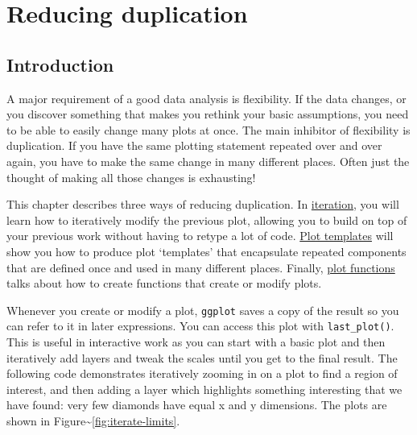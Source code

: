 \chapter{Reducing duplication}\label{cha:duplication}

\section{Introduction}

A major requirement of a good data analysis is flexibility. If the data
changes, or you discover something that makes you rethink your basic
assumptions, you need to be able to easily change many plots at once.
The main inhibitor of flexibility is duplication. If you have the same
plotting statement repeated over and over again, you have to make the
same change in many different places. Often just the thought of making
all those changes is exhausting!

This chapter describes three ways of reducing duplication. In
\hyperref[sec:iteration]{iteration}, you will learn how to iteratively
modify the previous plot, allowing you to build on top of your previous
work without having to retype a lot of code.
\hyperref[sec:templates]{Plot templates} will show you how to produce
plot `templates' that encapsulate repeated components that are defined
once and used in many different places. Finally,
\hyperref[sec:functions]{plot functions} talks about how to create
functions that create or modify plots. 


Whenever you create or modify a plot, \texttt{ggplot} saves a copy of
the result so you can refer to it in later expressions. You can access
this plot with \texttt{last\_plot()}. This is useful in interactive work
as you can start with a basic plot and then iteratively add layers and
tweak the scales until you get to the final result. The following code
demonstrates iteratively zooming in on a plot to find a region of
interest, and then adding a layer which highlights something interesting
that we have found: very few diamonds have equal x and y dimensions. The
plots are shown in Figure\textasciitilde{}\ref{fig:iterate-limits}.
  

